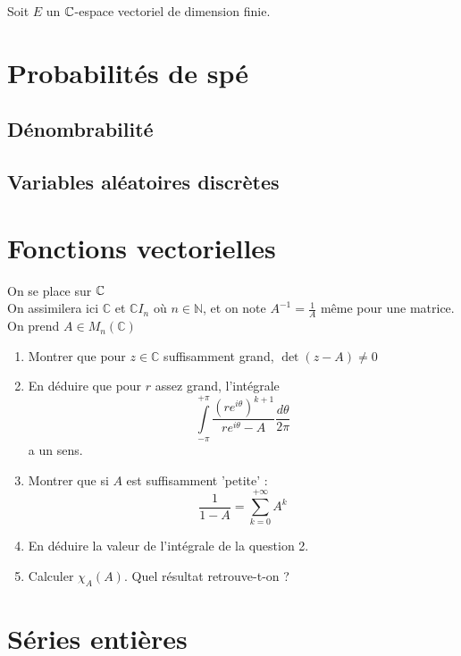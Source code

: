 \documentclass[12pt,a4paper]{exo_book}
\begin{document}
\begin{exo}
    Soit $E$ un $\mathbb{C}$-espace vectoriel de dimension finie.
\end{exo}


\chapter{Probabilités de spé}

\section{Dénombrabilité}

\section{Variables aléatoires discrètes}


\chapter{Fonctions vectorielles}

\begin{exo}
    On se place sur $\mathbb{C}$\\
    On assimilera ici $\mathbb{C}$ et $\mathbb{C}I_{n}$ où $n \in \mathbb{N}$, et on note $A^{-1} = \frac{1}{A}$ même pour une matrice.\\
    On prend $A \in M_{n}(\mathbb{C})$
    \begin{enumerate}
        \item Montrer que pour $z \in \mathbb{C}$ suffisamment grand, $\det(z - A) \neq 0 $
        \item En déduire que pour $r$ assez grand, l'intégrale \[\int\limits_{-\pi}^{+\pi}\frac{(re^{i\theta})^{k+1}}{re^{i\theta} - A}\frac{d\theta}{2\pi}\] a un sens. 
        \item Montrer que si $A$ est suffisamment 'petite' : \[\frac{1}{1-A} = \sum_{k=0}^{+\infty} A^{k} \]
        \item En déduire la valeur de l'intégrale de la question 2.
        \item Calculer $\chi_{A}(A)$. Quel résultat retrouve-t-on ?
    \end{enumerate}
\end{exo}


\chapter{Séries entières}
\end{document}

